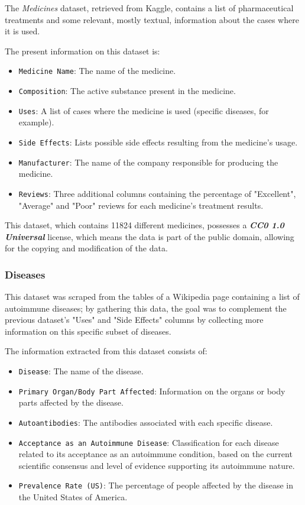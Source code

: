 \documentclass[sigconf]{acmart}
\begin{document}
The \textit{Medicines} dataset\cite{medicines_dataset}, retrieved from Kaggle, contains a list of pharmaceutical treatments and some relevant, mostly textual, information about the cases where it is used.

The present information on this dataset is:
\begin{itemize}
	\item {\texttt{Medicine Name}}: The name of the medicine.
	\item {\texttt{Composition}}: The active substance present in the medicine.
	\item {\texttt{Uses}}: A list of cases where the medicine is used (specific diseases, for example).
	\item {\texttt{Side Effects}}: Lists possible side effects resulting from the medicine's usage.
	\item {\texttt{Manufacturer}}: The name of the company responsible for producing the medicine.
	\item {\texttt{Reviews}}: Three additional columns containing the percentage of "Excellent", "Average" and "Poor" reviews for each medicine's treatment results.
\end{itemize}

This dataset, which contains 11824 different medicines, possesses a {\textit{\textbf{CC0 1.0 Universal}}}\cite{cczero} license, which means the data is part of the public domain, allowing for the copying and modification of the data.

\subsubsection{Diseases}

This dataset was scraped from the tables of a Wikipedia page containing a list of autoimmune diseases\cite{diseases_dataset}; by gathering this data, the goal was to complement the previous dataset's "Uses" and "Side Effects" columns by collecting more information on this specific subset of diseases.

The information extracted from this dataset consists of:
\begin{itemize}
	\item {\texttt{Disease}}: The name of the disease.
	\item {\texttt{Primary Organ/Body Part Affected}}: Information on the organs or body parts affected by the disease.
	\item {\texttt{Autoantibodies}}: The antibodies associated with each specific disease.
	\item {\texttt{Acceptance as an Autoimmune Disease}}: Classification for each disease related to its acceptance as an autoimmune condition, based on the current scientific consensus and level of evidence supporting its autoimmune nature.
	\item {\texttt{Prevalence Rate (US)}}: The percentage of people affected by the disease in the United States of America.
\end{itemize}
\end{document}
